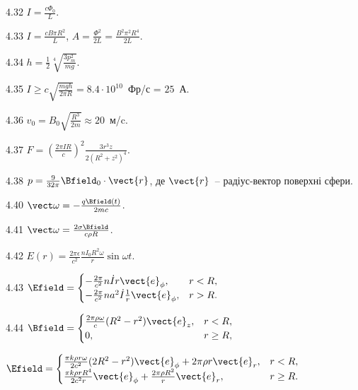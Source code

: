 \begin{Solution}{4.{32}}
	$I = \frac{c\Phi_0}{L}$.
\end{Solution}
\begin{Solution}{4.{33}}
	$I = \frac{cB\pi R^2}{L}$, $A = \frac{\Phi^2}{2L} = \frac{B^2\pi^2 R^4}{2L}$.
\end{Solution}
\begin{Solution}{4.{34}}
	$h = \frac12 \sqrt[4]{\frac{3p_m^2}{mg}}$.
\end{Solution}
\begin{Solution}{4.{35}}
	$I \ge c \sqrt{\frac{mgh}{2\pi R}} = 8.4\cdot 10^{10}$~Фр/с = $25$~А.
\end{Solution}
\begin{Solution}{4.{36}}
	$v_0 = B_0 \sqrt{\frac{R^3}{2m}} \approx 20$~м/c.
\end{Solution}
\begin{Solution}{4.{37}}
	$F = \left( \frac{2\pi I R}{c} \right)^2 \frac{3r^3 z}{2(R^2 + z^2)^4} $.
\end{Solution}
\begin{Solution}{4.{38}}
	$ p = \frac{9}{32\pi} \Bfield_0\cdot\vect{r}$, де $\vect{r}$~-- радіус-вектор поверхні сфери.
\end{Solution}
\begin{Solution}{4.{40}}
	$\vect\omega = -\frac{q\Bfield(t)}{2mc}$.
\end{Solution}
\begin{Solution}{4.{41}}
	$\vect\omega = \frac{2\sigma\Bfield}{c\rho R}$.
\end{Solution}
\begin{Solution}{4.{42}}
	$E(r) = \frac{2\pi\epsilon}{c^2}\frac{nI_0R^2\omega}{r}\sin\omega t$.
\end{Solution}
\begin{Solution}{4.{43}}
	$
		\Efield =
		\begin{cases}
			- \frac{2\pi}{c^2} n\dot{I} r\vect{e}_{\phi},               & r < R, \\
			- \frac{2\pi}{c^2} n a^2\dot{I} \frac{1}{r}\vect{e}_{\phi}, & r > R.
		\end{cases}
	$
\end{Solution}
\begin{Solution}{4.{44}}
	$
		\Bfield =
		\begin{cases}
			\frac{2\pi\rho\omega}{c}(R^2 - r^2)\vect{e}_z, & r< R,    \\
			0,                                             & r \ge R,
		\end{cases}
	$

	$
		\Efield =
		\begin{cases}
			\frac{\pi k \rho r\omega}{2c^2}(2R^2 - r^2)\vect{e}_{\phi} + 2\pi\rho r \vect{e}_r, & r< R,    \\
			\frac{\pi k \rho r R^4}{2c^2r}\vect{e}_{\phi} + \frac{2\pi \rho R^2}{r}\vect{e}_r,  & r \ge R.
		\end{cases}
	$
\end{Solution}
